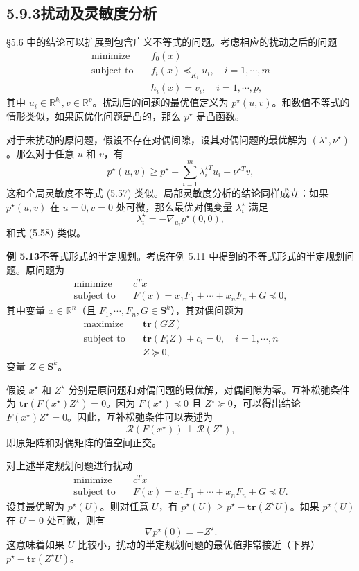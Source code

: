 \documentclass[UTF8, 12pt, fontset=fandol, oneside]{ctexart}
\begin{document}
\subsection*{5.9.3\quad 扰动及灵敏度分析}

§5.6 中的结论可以扩展到包含广义不等式的问题。考虑相应的扰动之后的问题
\[
\begin{aligned}
\text{minimize}\quad & f_0(x)\\
\text{subject to}\quad & f_i(x)\preceq_{K_i}u_i,\quad i=1,\cdots,m\\
& h_i(x)=v_i,\quad i=1,\cdots,p,
\end{aligned}
\]
其中 $u_i\in\mathbb{R}^{k_i},v\in\mathbb{R}^p$。扰动后的问题的最优值定义为 $p^\star(u,v)$。和数值不等式的情形类似，如果原优化问题是凸的，那么 $p^\star$ 是凸函数。

对于未扰动的原问题，假设不存在对偶间隙，设其对偶问题的最优解为 $(\lambda^\star,\nu^\star)$。那么对于任意 $u$ 和 $v$，有
\[
p^\star(u,v)\geq p^\star-\sum_{i=1}^m\lambda_i^{\star T}u_i-\nu^{\star T}v,
\]
这和全局灵敏度不等式 (5.57) 类似。局部灵敏度分析的结论同样成立：如果 $p^\star(u,v)$ 在 $u=0,v=0$ 处可微，那么最优对偶变量 $\lambda_i^\star$ 满足
\[
\lambda_i^\star=-\nabla_{u_i}p^\star(0,0),
\]
和式 (5.58) 类似。

\noindent\textbf{例 5.13}\quad 不等式形式的半定规划。考虑在例 5.11 中提到的不等式形式的半定规划问题。原问题为
\[
\begin{aligned}
\text{minimize}\quad & c^Tx\\
\text{subject to}\quad & F(x)=x_1F_1+\cdots+x_nF_n+G\preceq 0,
\end{aligned}
\]
其中变量 $x\in\mathbb{R}^n$（且 $F_1,\cdots,F_n,G\in\mathbf{S}^k$），其对偶问题为
\[
\begin{aligned}
\text{maximize}\quad & \mathbf{tr}(GZ)\\
\text{subject to}\quad & \mathbf{tr}(F_iZ)+c_i=0,\quad i=1,\cdots,n\\
& Z\succeq 0,
\end{aligned}
\]
变量 $Z\in\mathbf{S}^k$。

假设 $x^\star$ 和 $Z^\star$ 分别是原问题和对偶问题的最优解，对偶间隙为零。互补松弛条件为 $\mathbf{tr}(F(x^\star)Z^\star)=0$。因为 $F(x^\star)\preceq 0$ 且 $Z^\star\succeq 0$，可以得出结论 $F(x^\star)Z^\star=0$。因此，互补松弛条件可以表述为
\[
\mathcal{R}(F(x^\star))\perp\mathcal{R}(Z^\star),
\]
即原矩阵和对偶矩阵的值空间正交。

对上述半定规划问题进行扰动
\[
\begin{aligned}
\text{minimize}\quad & c^Tx\\
\text{subject to}\quad & F(x)=x_1F_1+\cdots+x_nF_n+G\preceq U.
\end{aligned}
\]
设其最优解为 $p^\star(U)$。则对任意 $U$，有 $p^\star(U)\geq p^\star-\mathbf{tr}(Z^\star U)$。如果 $p^\star(U)$ 在 $U=0$ 处可微，则有
\[
\nabla p^\star(0)=-Z^\star.
\]
这意味着如果 $U$ 比较小，扰动的半定规划问题的最优值非常接近（下界）$p^\star-\mathbf{tr}(Z^\star U)$。
\end{document}
